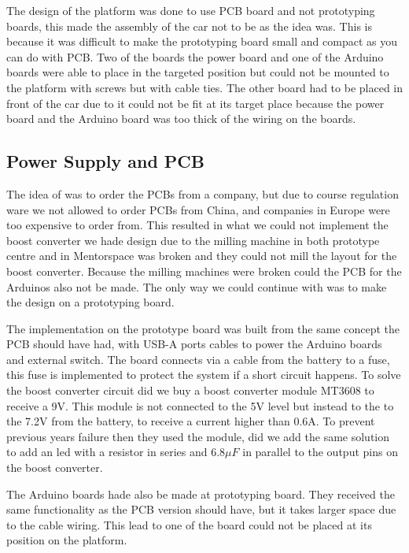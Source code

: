 \documentclass[11pt, titlepage]{article} %
\begin{document}
The design of the platform was done to use PCB board and not prototyping boards, this made the assembly of the car not to be as the idea was. This is because it was difficult to make the prototyping board small and compact as you can do with PCB. Two of the boards the power board and one of the Arduino boards were able to place in the targeted position but could not be mounted to the platform with screws but with cable ties. The other board had to be placed in front of the car due to it could not be fit at its target place because the power board and the Arduino board was too thick of the wiring on the boards. 
 

\subsection{Power Supply and PCB}

The idea of was to order the PCBs from a company, but due to course regulation ware we not allowed to order PCBs from China, and companies in Europe were too expensive to order from. This resulted in what we could not implement the boost converter we hade design due to the milling machine in both prototype centre and in Mentorspace was broken and they could not mill the layout for the boost converter. Because the milling machines were broken could the PCB for the Arduinos also not be made. The only way we could continue with was to make the design on a prototyping board. 

The implementation on the prototype board was built from the same concept the PCB should have had, with USB-A ports cables to power the Arduino boards and external switch. The board connects via a cable from the battery to a fuse, this fuse is implemented to protect the system if a short circuit happens. To solve the boost converter circuit did we buy a boost converter module MT3608 to receive a 9V. This module is not connected to the 5V level but instead to the to the 7.2V from the battery, to receive a current higher than 0.6A. To prevent previous years failure then they used the module, did we add the same solution to add an led with a resistor in series and $ 6.8\mu F$ in parallel to the output pins on the boost converter.

The Arduino boards hade also be made at prototyping board. They received the same functionality as the PCB version should have, but it takes larger space due to the cable wiring. This lead to one of the board could not be placed at its position on the platform. 
\end{document}
